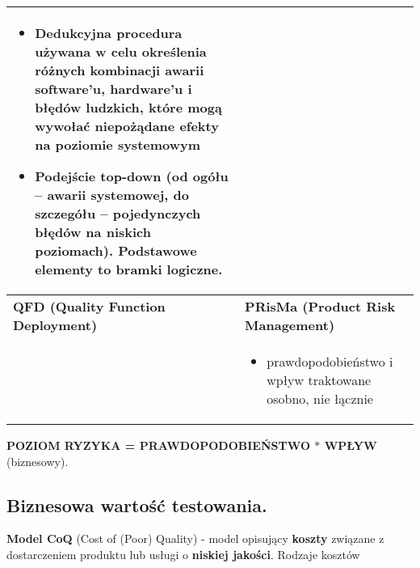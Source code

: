 \documentclass[../main.tex]{subfiles}
\begin{document}
\begin{table}[H]
\begin{center}
\begin{tabular}{| p{8cm} | p{8cm} |}
\begin{itemize}
                    \item Dedukcyjna procedura używana w celu określenia \textbf{różnych kombinacji awarii} software’u, hardware’u i błędów ludzkich, które mogą wywołać niepożądane efekty na poziomie systemowym
                    \item Podejście \textbf{top-down} (od ogółu – awarii systemowej, do szczegółu – pojedynczych błędów na niskich poziomach). Podstawowe elementy to bramki logiczne.
                \end{itemize}\\
                \hline
                \textbf{QFD (Quality Function Deployment)}
                &
                \textbf{PRisMa (Product Risk Management)}\\
                &
                \begin{itemize}
                    \item prawdopodobieństwo i wpływ traktowane osobno, nie łącznie
                \end{itemize}
                \\
                \hline
            \end{tabular}
        \end{center}
    \end{table}

    \textbf{POZIOM RYZYKA = PRAWDOPODOBIEŃSTWO $*$ WPŁYW}  (biznesowy).



    \subsection{Biznesowa wartość testowania.}

    \textbf{Model CoQ} (Cost of (Poor) Quality) - model opisujący \textbf{koszty} związane z dostarczeniem
    produktu lub usługi o \textbf{niskiej jakości}.
    Rodzaje kosztów
\end{document}
